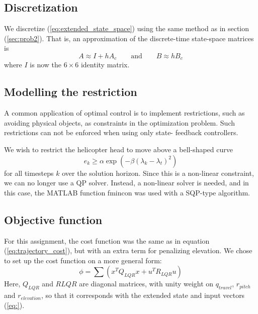 \subsection{Discretization}
We discretize (\ref{eq:extended_state_space}) using the same method
as in section (\ref{sec:prob2}). That is, an approximation of the
discrete-time state-space matrices is
\begin{equation}
    A \approx I + hA_c
    \qquad\text{and}\qquad
    B \approx hB_c
\end{equation}
where $I$ is now the $6\times6$ identity matrix.

\subsection{Modelling the restriction}
A common application of optimal control is to implement restrictions,
such as avoiding physical objects, as constraints in the optimization
problem. Such restrictions can not be enforced when using only state-
feedback controllers.

We wish to restrict the helicopter head to move above a bell-shaped curve
\begin{equation}
    e_k \geq \alpha \exp (-\beta (\lambda_k - \lambda_t)^2 )
\end{equation}
for all timesteps $k$ over the solution horizon. Since this is a non-linear constraint, we can no longer use a QP solver. Instead, a non-linear solver is needed, and in this case, the MATLAB function fmincon was used with a SQP-type algorithm.


\subsection{Objective function}
For this assignment, the cost function was the same as in equation (\ref{eq:trajectory_cost}), but with an extra term for penalizing elevation. We chose to set up the cost function on a more general form:
\begin{equation}
    \phi=\sum(x^{T}Q_{LQR}x+u^{T}R_{LQR}u)
\end{equation}
Here, $Q_{LQR}$ and $R{LQR}$ are diagonal matrices, with unity weight on $q_{travel}$, $r_{pitch}$ and $r_{elevation}$, so that it corresponds with the extended state and input vectors (\ref{eq:}). %

